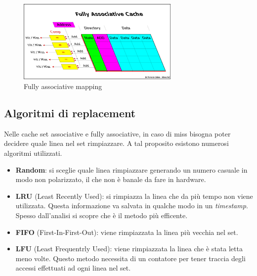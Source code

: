 \documentclass[11pt,4paper]{report}
\begin{document}
\begin{figure}[hbtp]
	\centering
	\includegraphics[width=0.7\textwidth]{mem_sys/fully_associative}
	\caption{Fully associative mapping}
	\label{fig:fully_associative}
\end{figure}

\subsection{Algoritmi di replacement}
Nelle cache set associative e fully associative, in caso di miss bisogna poter decidere quale linea nel set rimpiazzare. A tal proposito esistono numerosi algoritmi utilizzati.
\begin{itemize}
\item \textbf{Random}: si sceglie quale linea rimpiazzare generando un numero casuale in modo non polarizzato, il che non è banale da fare in hardware.
\item \textbf{LRU} (Least Recently Used): si rimpiazza la linea che da più tempo non viene utilizzata. Questa informazione va salvata in qualche modo in un \emph{timestamp}. Spesso dall'analisi si scopre che è il metodo più efficente.
\item \textbf{FIFO} (First-In-First-Out): viene rimpiazzata la linea più vecchia nel set.
\item \textbf{LFU} (Least Frequentrly Used): viene rimpiazzata la linea che è stata letta meno volte. Questo metodo necessita di un contatore per tener traccia degli accessi effettuati ad ogni linea nel set.
\end{itemize} 
\end{document}
